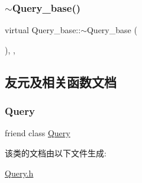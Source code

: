 \subsubsection{\texorpdfstring{$\sim$\+Query\+\_\+base()}{~Query\_base()}}
{\footnotesize\ttfamily virtual Query\+\_\+base\+::$\sim$\+Query\+\_\+base (\begin{DoxyParamCaption}{ }\end{DoxyParamCaption})\hspace{0.3cm}{\ttfamily [inline]}, {\ttfamily [protected]}, {\ttfamily [virtual]}}



\subsection{友元及相关函数文档}
\mbox{\label{classQuery__base_a0de80064a367adf51ab09f7a9b6de05a}} 
\subsubsection{\texorpdfstring{Query}{Query}}
{\footnotesize\ttfamily friend class \hyperlink{classQuery}{Query}\hspace{0.3cm}{\ttfamily [friend]}}



该类的文档由以下文件生成\+:\begin{DoxyCompactItemize}
\item 
\hyperlink{Query_8h}{Query.\+h}\end{DoxyCompactItemize}
